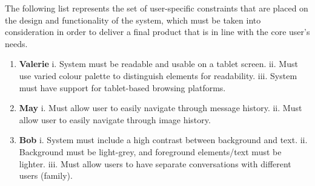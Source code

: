 \documentclass[11pt]{article}
\begin{document}
The following list represents the set of user-specific constraints that are placed on the design and
functionality of the system, which must be taken into consideration in order to deliver a final
product that is in line with the core user's needs.
\begin{enumerate}[label=\alph*.]
    \item \textbf{Valerie}
        \subitem i. System must be readable and usable on a tablet screen.
        \subitem ii. Must use varied colour palette to distinguish elements for readability.
        \subitem iii. System must have support for tablet-based browsing platforms.
    \item \textbf{May}
        \subitem i. Must allow user to easily navigate through message history.
        \subitem ii. Must allow user to easily navigate through image history.
    \item \textbf{Bob}
        \subitem i. System must include a high contrast between background and text.
        \subitem ii. Background must be light-grey, and foreground elements/text must be lighter.
        \subitem iii. Must allow users to have separate conversations with different users (family).
\end{enumerate}
\end{document}
